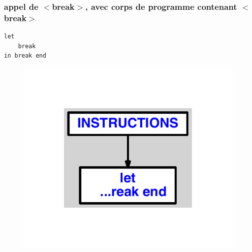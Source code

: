 \documentclass{article}
\begin{document}
\subsubsection{appel de $ < $break$ > $, avec corps de programme contenant $ < $break$ > $}
\begin{lstlisting}
let
	break
in break end
\end{lstlisting}
\newpage
\begin{figure}[H]
\centering
\includegraphics[max width=\textwidth]{ast/ast_12.pdf}
\end{figure}
\newpage
\end{document}
